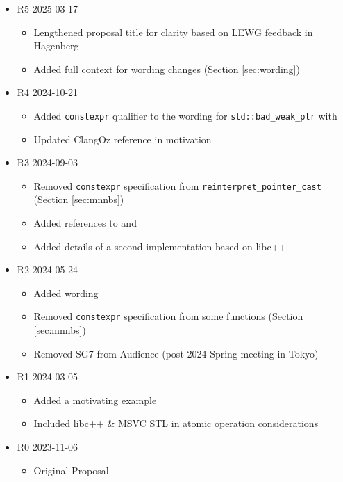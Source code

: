 \documentclass[10pt]{article}
\begin{document}
\begin{itemize}
\item R5 2025-03-17
  \begin{itemize}
  \item Lengthened proposal title for clarity based on LEWG feedback in Hagenberg
  \item Added full context for wording changes (Section \ref{sec:wording})
  \end{itemize}
\item R4 2024-10-21
  \begin{itemize}
  \item Added \texttt{constexpr} qualifier to the wording
        for \texttt{std::bad\_weak\_ptr} with \cite{P3068R6}
  \item Updated ClangOz reference in motivation
  \end{itemize}
\item R3 2024-09-03
  \begin{itemize}
  \item Removed \texttt{constexpr} specification from
        \texttt{reinterpret\_pointer\_cast} (Section \ref{sec:mnnbs})
  \item Added references to \cite{P3309R3} and \cite{P3068R6}
  \item Added details of a second implementation based on libc++
  \end{itemize}
\item R2 2024-05-24
  \begin{itemize}
  \item Added wording
  \item Removed \texttt{constexpr} specification from some
        functions (Section \ref{sec:mnnbs})
  \item Removed SG7 from Audience (post 2024 Spring meeting in Tokyo)
  \end{itemize}
\item R1 2024-03-05
  \begin{itemize}
  \item Added a motivating example
  \item Included libc++ \& MSVC STL in atomic operation considerations
  \end{itemize}
\item R0 2023-11-06
  \begin{itemize}
  \item Original Proposal
  \end{itemize}
\end{itemize}
\end{document}
